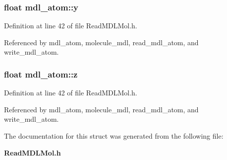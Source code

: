 \subsubsection{\setlength{\rightskip}{0pt plus 5cm}float mdl\_\-atom::y}\label{structmdl__atom_m1}




Definition at line 42 of file Read\-MDLMol.h.

Referenced by mdl\_\-atom, molecule\_\-mdl, read\_\-mdl\_\-atom, and write\_\-mdl\_\-atom.
\subsubsection{\setlength{\rightskip}{0pt plus 5cm}float mdl\_\-atom::z}\label{structmdl__atom_m2}




Definition at line 42 of file Read\-MDLMol.h.

Referenced by mdl\_\-atom, molecule\_\-mdl, read\_\-mdl\_\-atom, and write\_\-mdl\_\-atom.

The documentation for this struct was generated from the following file:\begin{CompactItemize}
\item 
{\bf Read\-MDLMol.h}\end{CompactItemize}
